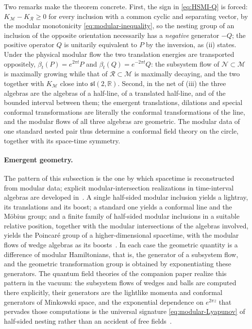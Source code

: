 \documentclass[a4paper,11pt]{article}
\theoremstyle{definition}
\newcommand{\mR}{\mathcal{R}}
\newcommand{\mN}{\mathcal{N}}
\newcommand{\mM}{\mathcal{M}}
\begin{document}
Two remarks make the theorem concrete. First, the sign in \eqref{eq:HSMI-Q} is forced: $K_{\mM}-K_{\mR}\ge0$ for every inclusion with a common cyclic and separating vector, by the modular monotonicity \eqref{eq:modular-inequality}, so the nesting group of an inclusion of the opposite orientation necessarily has a \emph{negative} generator $-Q$; the positive operator $Q$ is unitarily equivalent to $P$ by the inversion, as (ii) states. Under the physical modular flow the two translation energies are transported oppositely, $\beta_t(P)=e^{2\pi t}P$ and $\beta_t(Q)=e^{-2\pi t}Q$: the subsystem flow of $\mN\subset\mM$ is maximally growing while that of $\mR\subset\mM$ is maximally decaying, and the two together with $K_{\mM}$ close into $\mathfrak{sl}(2,\mathbb R)$. Second, in the net of (iii) the three algebras are the algebras of a half-line, of a translated half-line, and of the bounded interval between them; the emergent translations, dilations and special conformal transformations are literally the conformal transformations of the line, and the modular flows of all three algebras are geometric. The modular data of one standard nested pair thus determine a conformal field theory on the circle, together with its space-time symmetry.

\paragraph{Emergent geometry.}
The pattern of this subsection is the one by which spacetime is reconstructed from modular data; explicit modular-intersection realizations in time-interval algebras are developed in~\cite{LashkariLeungMoosaOuseph2025}. A single half-sided modular inclusion yields a lightray, its translations and its boost; a standard one yields a conformal line and the M\"obius group; and a finite family of half-sided modular inclusions in a suitable relative position, together with the modular intersections of the algebras involved, yields the Poincar\'e group of a higher-dimensional spacetime, with the modular flows of wedge algebras as its boosts~\cite{KahlerWiesbrock2001}. In each case the geometric quantity is a difference of modular Hamiltonians, that is, the generator of a subsystem flow, and the geometric transformation group is obtained by exponentiating these generators. The quantum field theories of the companion paper realize this pattern in the vacuum: the subsystem flows of wedges and balls are computed there explicitly, their generators are the lightlike momenta and conformal generators of Minkowski space, and the exponential dependence on $e^{2\pi z}$ that pervades those computations is the universal signature \eqref{eq:modular-Lyapunov} of half-sided nesting rather than an accident of free fields~\cite{companionQFT}.
\end{document}
